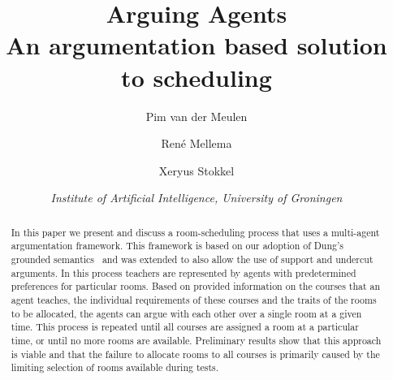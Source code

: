 \documentclass[a4paper]{article}
\title{\textbf{\huge Arguing Agents\\An argumentation based solution to
        scheduling}}
\author{Pim van der Meulen\and Ren\'e Mellema \and Xeryus Stokkel}
\date{\textit{Institute of Artificial Intelligence, University of
        Groningen}}
\theoremstyle{definition}
\begin{document}
\ttl{}
\thispagestyle{empty}

\begin{abstract}
    \noindent
    In this paper we present and discuss a room-scheduling process that
    uses a multi-agent argumentation framework. This framework is based on
    our adoption of Dung's grounded semantics~\cite{dungargfund} and was
    extended to also allow the use of support and undercut arguments. In
    this process teachers are represented by agents with predetermined
    preferences for particular rooms. Based on provided information on the
    courses that an agent teaches, the individual requirements of these
    courses and the traits of the rooms to be allocated, the agents can
    argue with each other over a single room at a given time. This process
    is repeated until all courses are assigned a room at a particular
    time, or until no more rooms are available. Preliminary results
    show that this approach is viable and that the failure to allocate
    rooms to all courses is primarily caused by the limiting selection of
    rooms available during tests.
\end{abstract}














\FloatBarrier{}
\appendix

\end{document}
